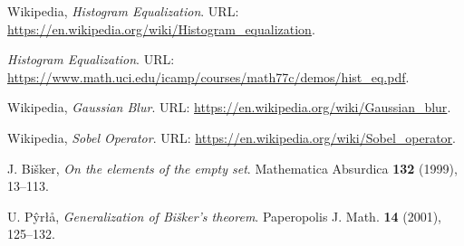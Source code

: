 \begin{thebibliography}{3}
Wikipedia,
\emph{Histogram Equalization}.
URL: \url{https://en.wikipedia.org/wiki/Histogram_equalization}.


\emph{Histogram Equalization}.
URL: \url{https://www.math.uci.edu/icamp/courses/math77c/demos/hist_eq.pdf}.

Wikipedia,
\emph{Gaussian Blur}.
URL: \url{https://en.wikipedia.org/wiki/Gaussian_blur}.

Wikipedia,
\emph{Sobel Operator}.
URL: \url{https://en.wikipedia.org/wiki/Sobel_operator}.







J. Bi\v{s}ker, \emph{On the elements
of the empty set}. Mathematica Absurdica
\textbf{132} (1999), 13--113.


U. P\^{y}r{\l}\aa, \emph{Generalization
of Bi\v{s}ker's theorem}. Paperopolis
J. Math. \textbf{14} (2001), 125--132.


\end{thebibliography}
\nonfrenchspacing
